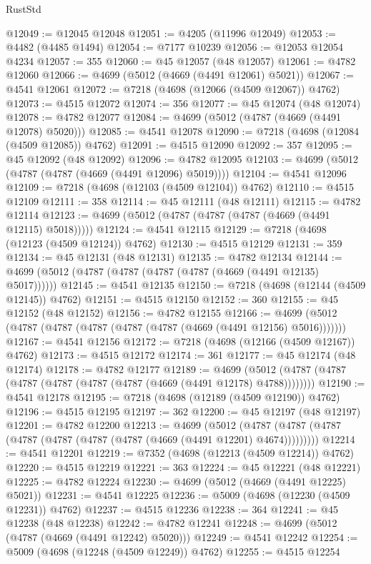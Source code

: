 \begin{lexlean}{RustStd}
\begin{coremodule}
@12049 := @12045 @12048
@12051 := @4205 (@11996 @12049)
@12053 := @4482 (@4485 @1494)
@12054 := @7177 @10239
@12056 := @12053 @12054 @4234
@12057 := 355
@12060 := @45 @12057 (@48 @12057)
@12061 := @4782 @12060
@12066 := @4699 (@5012 (@4669 (@4491 @12061) @5021))
@12067 := @4541 @12061
@12072 := @7218 (@4698 (@12066 (@4509 @12067)) @4762)
@12073 := @4515 @12072
@12074 := 356
@12077 := @45 @12074 (@48 @12074)
@12078 := @4782 @12077
@12084 := @4699 (@5012 (@4787 (@4669 (@4491 @12078) @5020)))
@12085 := @4541 @12078
@12090 := @7218 (@4698 (@12084 (@4509 @12085)) @4762)
@12091 := @4515 @12090
@12092 := 357
@12095 := @45 @12092 (@48 @12092)
@12096 := @4782 @12095
@12103 := @4699 (@5012 (@4787 (@4787 (@4669 (@4491 @12096) @5019))))
@12104 := @4541 @12096
@12109 := @7218 (@4698 (@12103 (@4509 @12104)) @4762)
@12110 := @4515 @12109
@12111 := 358
@12114 := @45 @12111 (@48 @12111)
@12115 := @4782 @12114
@12123 := @4699 (@5012 (@4787 (@4787 (@4787 (@4669 (@4491 @12115) @5018)))))
@12124 := @4541 @12115
@12129 := @7218 (@4698 (@12123 (@4509 @12124)) @4762)
@12130 := @4515 @12129
@12131 := 359
@12134 := @45 @12131 (@48 @12131)
@12135 := @4782 @12134
@12144 := @4699 (@5012 (@4787 (@4787 (@4787 (@4787 (@4669 (@4491 @12135) @5017))))))
@12145 := @4541 @12135
@12150 := @7218 (@4698 (@12144 (@4509 @12145)) @4762)
@12151 := @4515 @12150
@12152 := 360
@12155 := @45 @12152 (@48 @12152)
@12156 := @4782 @12155
@12166 := @4699 (@5012 (@4787 (@4787 (@4787 (@4787 (@4787 (@4669 (@4491 @12156) @5016)))))))
@12167 := @4541 @12156
@12172 := @7218 (@4698 (@12166 (@4509 @12167)) @4762)
@12173 := @4515 @12172
@12174 := 361
@12177 := @45 @12174 (@48 @12174)
@12178 := @4782 @12177
@12189 := @4699 (@5012 (@4787 (@4787 (@4787 (@4787 (@4787 (@4787 (@4669 (@4491 @12178) @4788))))))))
@12190 := @4541 @12178
@12195 := @7218 (@4698 (@12189 (@4509 @12190)) @4762)
@12196 := @4515 @12195
@12197 := 362
@12200 := @45 @12197 (@48 @12197)
@12201 := @4782 @12200
@12213 := @4699
    (@5012 (@4787 (@4787 (@4787 (@4787 (@4787 (@4787 (@4787 (@4669 (@4491 @12201) @4674)))))))))
@12214 := @4541 @12201
@12219 := @7352 (@4698 (@12213 (@4509 @12214)) @4762)
@12220 := @4515 @12219
@12221 := 363
@12224 := @45 @12221 (@48 @12221)
@12225 := @4782 @12224
@12230 := @4699 (@5012 (@4669 (@4491 @12225) @5021))
@12231 := @4541 @12225
@12236 := @5009 (@4698 (@12230 (@4509 @12231)) @4762)
@12237 := @4515 @12236
@12238 := 364
@12241 := @45 @12238 (@48 @12238)
@12242 := @4782 @12241
@12248 := @4699 (@5012 (@4787 (@4669 (@4491 @12242) @5020)))
@12249 := @4541 @12242
@12254 := @5009 (@4698 (@12248 (@4509 @12249)) @4762)
@12255 := @4515 @12254

\end{coremodule}
\end{lexlean}
